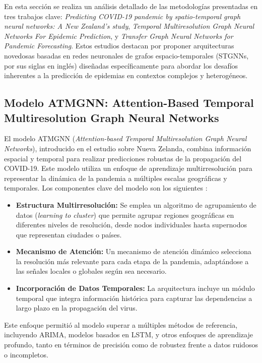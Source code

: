 En esta sección se realiza un análisis detallado de las metodologías presentadas en tres trabajos clave: \textit{Predicting COVID-19 pandemic by spatio-temporal graph neural networks: A New Zealand’s study}, \textit{Temporal Multiresolution Graph Neural Networks For Epidemic Prediction}, y \textit{Transfer Graph Neural Networks for Pandemic Forecasting}. Estos estudios destacan por proponer arquitecturas novedosas basadas en redes neuronales de grafos espacio-temporales (STGNNs, por sus siglas en inglés) diseñadas específicamente para abordar los desafíos inherentes a la predicción de epidemias en contextos complejos y heterogéneos.

\subsection{Modelo ATMGNN: Attention-Based Temporal Multiresolution Graph Neural Networks}

El modelo ATMGNN (\textit{Attention-based Temporal Multiresolution Graph Neural Networks}), introducido en el estudio sobre Nueva Zelanda, combina información espacial y temporal para realizar predicciones robustas de la propagación del COVID-19. Este modelo utiliza un enfoque de aprendizaje multirresolución para representar la dinámica de la pandemia a múltiples escalas geográficas y temporales. Los componentes clave del modelo son los siguientes \cite{174}:

\begin{itemize}
    \item \textbf{Estructura Multirresolución:} Se emplea un algoritmo de agrupamiento de datos (\textit{learning to cluster}) que permite agrupar regiones geográficas en diferentes niveles de resolución, desde nodos individuales hasta supernodos que representan ciudades o países.
    \item \textbf{Mecanismo de Atención:} Un mecanismo de atención dinámico selecciona la resolución más relevante para cada etapa de la pandemia, adaptándose a las señales locales o globales según sea necesario.
    \item \textbf{Incorporación de Datos Temporales:} La arquitectura incluye un módulo temporal que integra información histórica para capturar las dependencias a largo plazo en la propagación del virus.
\end{itemize}

Este enfoque permitió al modelo superar a múltiples métodos de referencia, incluyendo ARIMA, modelos basados en LSTM, y otros enfoques de aprendizaje profundo, tanto en términos de precisión como de robustez frente a datos ruidosos o incompletos.

